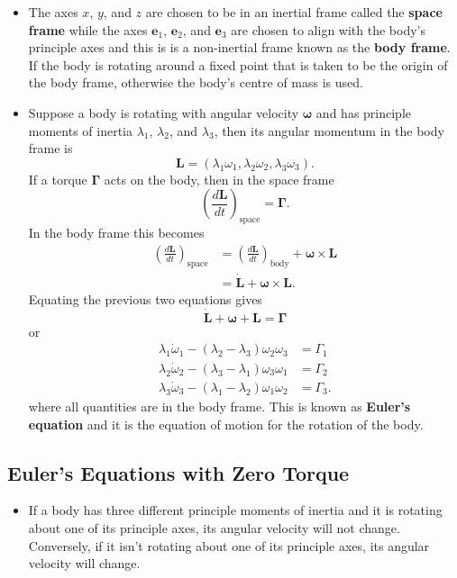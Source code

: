 \documentclass{article}
\renewcommand{\vec}[1]{\boldsymbol{\mathbf{#1}}}
\newcommand{\dvec}[1]{\dot{\vec{#1}}}
\begin{document}
\begin{itemize}
  \item The axes $x$, $y$, and $z$ are chosen to be in an inertial frame called the \textbf{space frame} while the axes $\vec{e}_1$, $\vec{e}_2$, and $\vec{e}_3$ are chosen to align with the body's principle axes and this is is a non-inertial frame known as the \textbf{body frame}. If the body is rotating around a fixed point that is taken to be the origin of the body frame, otherwise the body's centre of mass is used.

  \item Suppose a body is rotating with angular velocity $\vec{\omega}$ and has principle moments of inertia $\lambda_1$, $\lambda_2$, and $\lambda_3$, then its angular momentum in the body frame is \[\vec{L} = (\lambda_1 \omega_1, \lambda_2 \omega_2, \lambda_3 \omega_3).\] If a torque $\vec{\Gamma}$ acts on the body, then in the space frame \[\left( \frac{d \vec{L}}{d t} \right)_\text{space} = \vec{\Gamma}.\] In the body frame this becomes \begin{align*}
          \left( \frac{d \vec{L}}{d t} \right)_\text{space} & = \left( \frac{d \vec{L}}{d t} \right)_\text{body} + \vec{\omega} \times \vec{L} \\
                                                            & = \dvec{L} + \vec{\omega} \times \vec{L}.
        \end{align*} Equating the previous two equations gives \[\dvec{L} + \vec{\omega} + \vec{L} = \vec{\Gamma}\] or \begin{align*}
          \lambda_1 \dot{\omega}_1 - (\lambda_2 - \lambda_3) \omega_2 \omega_3 & = \Gamma_1  \\
          \lambda_2 \dot{\omega}_2 - (\lambda_3 - \lambda_1) \omega_3 \omega_1 & = \Gamma_2  \\
          \lambda_3 \dot{\omega}_3 - (\lambda_1 - \lambda_2) \omega_1 \omega_2 & = \Gamma_3.
        \end{align*} where all quantities are in the body frame. This is known as \textbf{Euler's equation} and it is the equation of motion for the rotation of the body.
\end{itemize}

\subsection{Euler's Equations with Zero Torque}

\begin{itemize}
  \item If a body has three different principle moments of inertia and it is rotating about one of its principle axes, its angular velocity will not change. Conversely, if it isn't rotating about one of its principle axes, its angular velocity will change.
\end{itemize}
\end{document}
